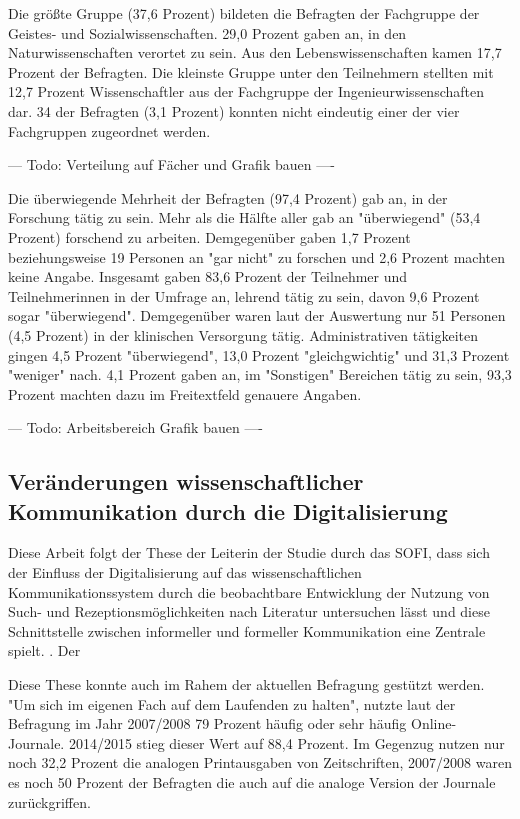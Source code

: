 Die größte Gruppe (37,6 Prozent) bildeten die Befragten der Fachgruppe der Geistes- und Sozialwissenschaften. 29,0 Prozent gaben an, in den Naturwissenschaften verortet zu sein. Aus den Lebenswissenschaften kamen 17,7 Prozent der Befragten. Die kleinste Gruppe unter den Teilnehmern stellten mit 12,7 Prozent Wissenschaftler aus der Fachgruppe der Ingenieurwissenschaften dar. 34 der Befragten (3,1 Prozent) konnten nicht eindeutig einer der vier Fachgruppen zugeordnet werden.

--- Todo: Verteilung auf Fächer und Grafik bauen ----

Die überwiegende Mehrheit der Befragten (97,4 Prozent) gab an, in der Forschung tätig zu sein. Mehr als die Hälfte aller gab an "überwiegend" (53,4 Prozent) forschend zu arbeiten. Demgegenüber gaben 1,7 Prozent beziehungsweise 19 Personen an "gar nicht" zu forschen und 2,6 Prozent machten keine Angabe. Insgesamt gaben 83,6 Prozent der Teilnehmer und Teilnehmerinnen in der Umfrage an, lehrend tätig zu sein, davon 9,6 Prozent sogar "überwiegend". Demgegenüber waren laut der Auswertung nur 51 Personen (4,5 Prozent) in der klinischen Versorgung tätig. Administrativen tätigkeiten gingen 4,5 Prozent "überwiegend", 13,0 Prozent "gleichgwichtig" und 31,3 Prozent "weniger" nach. 4,1 Prozent gaben an, im "Sonstigen" Bereichen tätig zu sein, 93,3 Prozent machten dazu im Freitextfeld genauere Angaben.

--- Todo: Arbeitsbereich Grafik bauen ----

\subsection{Veränderungen wissenschaftlicher Kommunikation durch die Digitalisierung}

Diese Arbeit folgt der These der Leiterin der Studie durch das SOFI, dass sich der Einfluss der Digitalisierung auf das wissenschaftlichen Kommunikationssystem  durch die beobachtbare Entwicklung der Nutzung von Such- und Rezeptionsmöglichkeiten nach Literatur untersuchen lässt und diese Schnittstelle zwischen informeller und formeller Kommunikation eine Zentrale spielt. \cite{Hanekop_2014}. Der

Diese These konnte auch im Rahem der aktuellen Befragung gestützt werden. "Um sich im eigenen Fach auf dem Laufenden zu halten", nutzte laut der Befragung im Jahr 2007/2008 79 Prozent häufig oder sehr häufig Online-Journale. 2014/2015 stieg dieser Wert auf 88,4 Prozent. Im Gegenzug nutzen nur noch 32,2 Prozent die analogen Printausgaben von Zeitschriften, 2007/2008 waren es noch 50 Prozent der Befragten die auch auf die analoge Version der Journale zurückgriffen.

